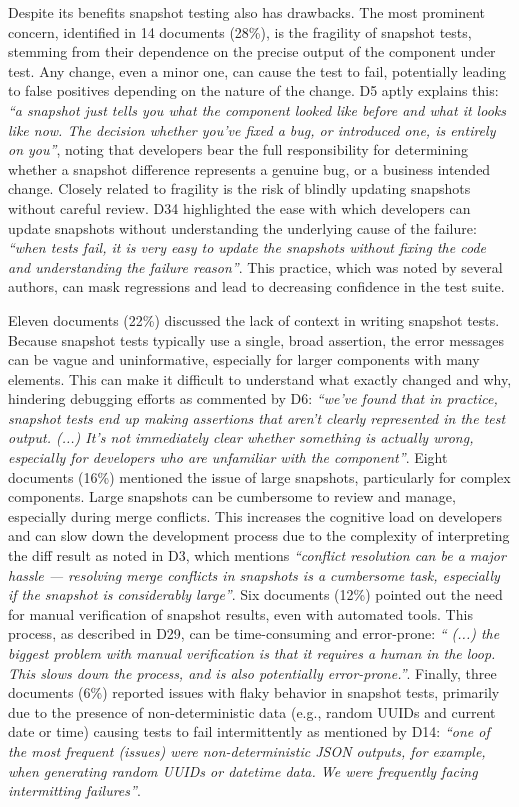 \documentclass[
	msc, %
	english %
]{../ppgccufmg}
\begin{document}
        Despite its benefits snapshot testing also has drawbacks. The most prominent concern, identified in 14 documents (28\%), is the fragility of snapshot tests, stemming from their dependence on the precise output of the component under test. Any change, even a minor one, can cause the test to fail, potentially leading to false positives depending on the nature of the change. D5 aptly explains this: \textit{“a snapshot just tells you what the component looked like before and what it looks like now. The decision whether you’ve fixed a bug, or introduced one, is entirely on you”}, noting that developers bear the full responsibility for determining whether a snapshot difference represents a genuine bug, or a business intended change. Closely related to fragility is the risk of blindly updating snapshots without careful review. D34 highlighted the ease with which developers can update snapshots without understanding the underlying cause of the failure: \textit{“when tests fail, it is very easy to update the snapshots without fixing the code and understanding the failure reason”}. This practice, which was noted by several authors, can mask regressions and lead to decreasing confidence in the test suite.

        Eleven documents (22\%) discussed the lack of context in writing snapshot tests. Because snapshot tests typically use a single, broad assertion, the error messages can be vague and uninformative, especially for larger components with many elements. This can make it difficult to understand what exactly changed and why, hindering debugging efforts as commented by D6: \textit{“we’ve found that in practice, snapshot tests end up making assertions that aren’t clearly represented in the test output. (...) It’s not immediately clear whether something is actually wrong, especially for developers who are unfamiliar with the component”}. Eight documents (16\%) mentioned the issue of large snapshots, particularly for complex components. Large snapshots can be cumbersome to review and manage, especially during merge conflicts. This increases the cognitive load on developers and can slow down the development process due to the complexity of interpreting the diff result as noted in D3, which mentions \textit{“conflict resolution can be a major hassle — resolving merge conflicts in snapshots is a cumbersome task, especially if the snapshot is considerably large”}. Six documents (12\%) pointed out the need for manual verification of snapshot results, even with automated tools. This process, as described in D29, can be time-consuming and error-prone: \textit{“ (...) the biggest problem with manual verification is that it requires a human in the loop. This slows down the process, and is also potentially error-prone.”}. Finally, three documents (6\%) reported issues with flaky behavior in snapshot tests, primarily due to the presence of non-deterministic data (e.g., random UUIDs and current date or time) causing tests to fail intermittently as mentioned by D14: \textit{“one of the most frequent (issues) were non-deterministic JSON outputs, for example, when generating random UUIDs or datetime data. We were frequently facing intermitting failures”}.
\end{document}
